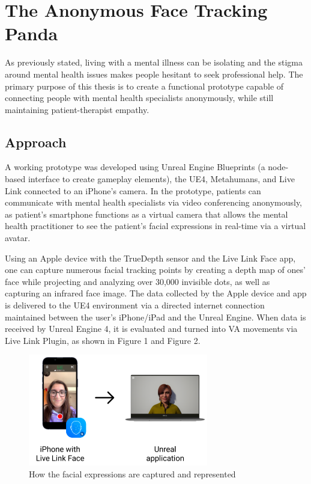 \section{The Anonymous Face Tracking Panda}
As previously stated, living with a mental illness can be isolating and the stigma around mental health issues makes people hesitant to seek professional help. The primary purpose of this thesis is to create a functional prototype capable of connecting people with mental health specialists anonymously, while still maintaining patient-therapist empathy.

\subsection{Approach}
A working prototype was developed using Unreal Engine Blueprints (a node-based interface to create gameplay elements), the UE4, Metahumans, and Live Link connected to an iPhone's camera. In the prototype, patients can communicate with mental health specialists via video conferencing anonymously, as patient's smartphone functions as a virtual camera that allows the mental health practitioner to see the patient's facial expressions in real-time via a virtual avatar.

Using an Apple device with the TrueDepth sensor and the Live Link Face app, one can capture numerous facial tracking points by creating a depth map of ones’ face while projecting and analyzing over 30,000 invisible dots, as well as capturing an infrared face image. The data collected by the Apple device and app is delivered to the UE4 environment via a directed internet connection maintained between the user's iPhone/iPad and the Unreal Engine. When data is received by Unreal Engine 4, it is evaluated and turned into VA movements via Live Link Plugin, as shown in Figure 1 and Figure 2.

\begin{figure}[h!]
\includegraphics[width=0.7\textwidth]{figures/howItWorks.png}
\centering
\caption{How the facial expressions are captured and represented}
\end{figure}

